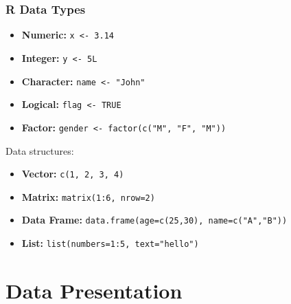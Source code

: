 \documentclass{beamer}
\begin{document}
\begin{frame}[fragile]
\frametitle{R Data Types}
\begin{itemize}
\item \textbf{Numeric:} \texttt{x <- 3.14}
\item \textbf{Integer:} \texttt{y <- 5L}
\item \textbf{Character:} \texttt{name <- "John"}
\item \textbf{Logical:} \texttt{flag <- TRUE}
\item \textbf{Factor:} \texttt{gender <- factor(c("M", "F", "M"))}
\end{itemize}

\vspace{0.5cm}
Data structures:
\begin{itemize}
\item \textbf{Vector:} \texttt{c(1, 2, 3, 4)}
\item \textbf{Matrix:} \texttt{matrix(1:6, nrow=2)}
\item \textbf{Data Frame:} \texttt{data.frame(age=c(25,30), name=c("A","B"))}
\item \textbf{List:} \texttt{list(numbers=1:5, text="hello")}
\end{itemize}
\end{frame}

\section{Data Presentation}
\end{document}
